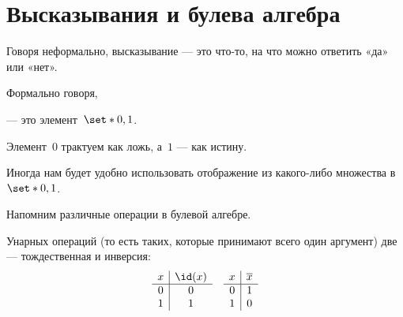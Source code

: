 
\section{Высказывания и булева алгебра}

Говоря неформально, высказывание --- это что-то, на что можно ответить «да» или «нет».

Формально говоря,
\begin{definition}
	 --- это элемент~$\set*{0, 1}$.
\end{definition}

Элемент~$0$ трактуем как ложь, а~$1$ --- как истину.

Иногда нам будет удобно использовать отображение из какого-либо множества в~$\set*{0, 1}$.


Напомним различные операции в булевой алгебре.

Унарных операций (то есть таких, которые принимают всего один аргумент) две --- тождественная и инверсия:
\begin{align*}
	\begin{array}{c|c}
		x & \id(x)
		\\\hline
		0 & 0
		\\
		1 & 1
	\end{array}
	&&
	\begin{array}{c|c}
		x & \overline{x}
		\\\hline
		0 & 1
		\\
		1 & 0
	\end{array}
\end{align*}

